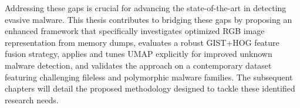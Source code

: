 Addressing these gaps is crucial for advancing the state-of-the-art in detecting evasive malware. This thesis contributes to bridging these gaps by proposing an enhanced framework that specifically investigates optimized RGB image representation from memory dumps, evaluates a robust GIST+HOG feature fusion strategy, applies and tunes UMAP explicitly for improved unknown malware detection, and validates the approach on a contemporary dataset featuring challenging fileless and polymorphic malware families. The subsequent chapters will detail the proposed methodology designed to tackle these identified research needs.
